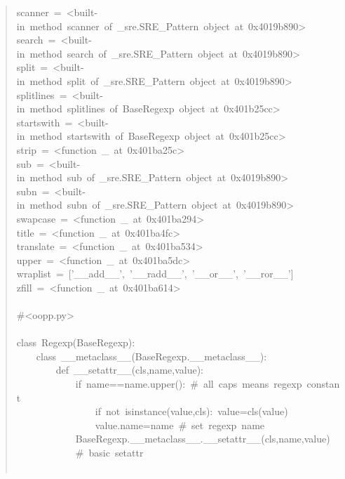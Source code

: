 \documentclass[10pt,english]{article}
\begin{document}
\begin{quote}
\begin{ttfamily}
\begin{flushleft}
\mbox{scanner~=~<built-in~method~scanner~of~{\_}sre.SRE{\_}Pattern~object~at~0x4019b890>}\\
\mbox{search~=~<built-in~method~search~of~{\_}sre.SRE{\_}Pattern~object~at~0x4019b890>}\\
\mbox{split~=~<built-in~method~split~of~{\_}sre.SRE{\_}Pattern~object~at~0x4019b890>}\\
\mbox{splitlines~=~<built-in~method~splitlines~of~BaseRegexp~object~at~0x401b25cc>}\\
\mbox{startswith~=~<built-in~method~startswith~of~BaseRegexp~object~at~0x401b25cc>}\\
\mbox{strip~=~<function~{\_}~at~0x401ba25c>}\\
\mbox{sub~=~<built-in~method~sub~of~{\_}sre.SRE{\_}Pattern~object~at~0x4019b890>}\\
\mbox{subn~=~<built-in~method~subn~of~{\_}sre.SRE{\_}Pattern~object~at~0x4019b890>}\\
\mbox{swapcase~=~<function~{\_}~at~0x401ba294>}\\
\mbox{title~=~<function~{\_}~at~0x401ba4fc>}\\
\mbox{translate~=~<function~{\_}~at~0x401ba534>}\\
\mbox{upper~=~<function~{\_}~at~0x401ba5dc>}\\
\mbox{wraplist~=~['{\_}{\_}add{\_}{\_}',~'{\_}{\_}radd{\_}{\_}',~'{\_}{\_}or{\_}{\_}',~'{\_}{\_}ror{\_}{\_}']}\\
\mbox{zfill~=~<function~{\_}~at~0x401ba614>}\\
\mbox{}\\
\mbox{{\#}<oopp.py>}\\
\mbox{}\\
\mbox{class~Regexp(BaseRegexp):}\\
\mbox{~~~~class~{\_}{\_}metaclass{\_}{\_}(BaseRegexp.{\_}{\_}metaclass{\_}{\_}):}\\
\mbox{~~~~~~~~def~{\_}{\_}setattr{\_}{\_}(cls,name,value):}\\
\mbox{~~~~~~~~~~~~if~name==name.upper():~{\#}~all~caps~means~regexp~constant}\\
\mbox{~~~~~~~~~~~~~~~~if~not~isinstance(value,cls):~value=cls(value)}\\
\mbox{~~~~~~~~~~~~~~~~value.name=name~{\#}~set~regexp~name}\\
\mbox{~~~~~~~~~~~~BaseRegexp.{\_}{\_}metaclass{\_}{\_}.{\_}{\_}setattr{\_}{\_}(cls,name,value)}\\
\mbox{~~~~~~~~~~~~{\#}~basic~setattr}\\
\mbox{}\\

\end{flushleft}
\end{ttfamily}
\end{quote}
\end{document}
